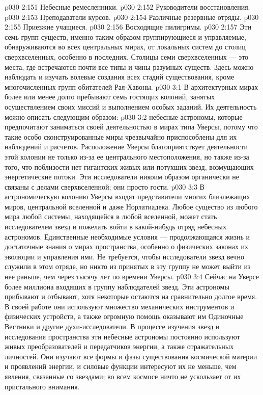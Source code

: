\vs p030 2:151 \bibnobreakspace Небесные ремесленники.
\vs p030 2:152 \bibnobreakspace Руководители восстановления.
\vs p030 2:153 \bibnobreakspace Преподаватели курсов.
\vs p030 2:154 \bibnobreakspace Различные резервные отряды.
\vs p030 2:155 \bibnobreakspace Приезжие учащиеся.
\vs p030 2:156 \bibnobreakspace Восходящие пилигримы.
\vs p030 2:157 \pc Эти семь групп существ, именно таким образом группирующиеся и управляемые, обнаруживаются во всех центральных мирах, от локальных систем до столиц сверхвселенных, особенно в последних. Столицы семи сверхвселенных --- это места, где встречаются почти все типы и чины разумных существ. Здесь можно наблюдать и изучать волевые создания всех стадий существования, кроме многочисленных групп обитателей Рая\hyp{}Хавоны.
\vs p030 3:1 В архитектурных мирах более или менее долго пребывают семь гостящих колоний, занятых осуществлением своих миссий и выполнением особых заданий. Их деятельность можно описать следующим образом:
\vs p030 3:2 \bibnobreakspace {} небесные астрономы, которые предпочитают заниматься своей деятельностью в мирах типа Уверсы, потому что такие особо сконструированные миры чрезвычайно приспособлены для их наблюдений и расчетов. Расположение Уверсы благоприятствует деятельности этой колонии не только из\hyp{}за ее центрального местоположения, но также из\hyp{}за того, что поблизости нет гигантских живых или потухших звезд, возмущающих энергетические потоки. Эти исследователи никоим образом органически не связаны с делами сверхвселенной; они просто гости.
\vs p030 3:3 В астрономическую колонию Уверсы входят представители многих близлежащих миров, центральной вселенной и даже Норлатиадека. Любое существо из любого мира любой системы, находящейся в любой вселенной, может стать исследователем звезд и пожелать войти в какой\hyp{}нибудь отряд небесных астрономов. Единственные необходимые условия --- продолжающаяся жизнь и достаточные знания о мирах пространства, особенно о физических законах их эволюции и управления ими. Не требуется, чтобы исследователи звезд вечно служили в этом отряде, но никто из принятых в эту группу не может выйти из нее раньше, чем через тысячу лет по времени Уверсы.
\vs p030 3:4 Сейчас на Уверсе более миллиона входящих в группу наблюдателей звезд. Эти астрономы прибывают и отбывают, хотя некоторые остаются на сравнительно долгое время. В своей работе они используют множество механических инструментов и физических устройств, а также огромную помощь оказывают им Одиночные Вестники и другие духи\hyp{}исследователи. В процессе изучения звезд и исследования пространства эти небесные астрономы постоянно используют живых преобразователей и передатчиков энергии, а также отражательных личностей. Они изучают все формы и фазы существования космической материи и проявлений энергии, и силовые функции интересуют их не меньше, чем явления, связанные со звездами; во всем космосе ничто не ускользает от их пристального внимания.
